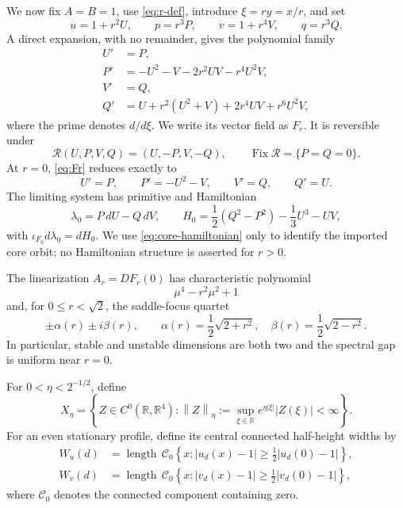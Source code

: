 \documentclass[11pt,reqno]{amsart}
\numberwithin{equation}{section}
\theoremstyle{remark}
\newcommand{\R}{\mathbb R}
\newcommand{\Fix}{\operatorname{Fix}}
\newcommand{\cR}{\mathcal R}
\newcommand{\norm}[1]{\left\lVert #1\right\rVert}
\begin{document}
We now fix $A=B=1$, use \eqref{eq:r-def}, introduce
$\xi=ry=x/r$, and set
\begin{equation}\label{eq:central-scaling}
 u=1+r^2U,\qquad p=r^3P,\qquad
 v=1+r^4V,\qquad q=r^3Q.
\end{equation}
A direct expansion, with no remainder, gives the polynomial family
\begin{equation}\label{eq:Fr}
 \begin{aligned}
 U'&=P,\\
 P'&=-U^2-V-2r^2UV-r^4U^2V,\\
 V'&=Q,\\
 Q'&=U+r^2(U^2+V)+2r^4UV+r^6U^2V,
 \end{aligned}
\end{equation}
where the prime denotes $d/d\xi$.  We write its vector field as $F_r$.
It is reversible under
\begin{equation}\label{eq:central-reverser}
 \cR(U,P,V,Q)=(U,-P,V,-Q),
 \qquad \Fix\cR=\{P=Q=0\}.
\end{equation}
At $r=0$, \eqref{eq:Fr} reduces exactly to
\begin{equation}\label{eq:core-system}
 U'=P,\qquad P'=-U^2-V,\qquad V'=Q,\qquad Q'=U.
\end{equation}
The limiting system has primitive and Hamiltonian
\begin{equation}\label{eq:core-hamiltonian}
 \lambda_0=P\,dU-Q\,dV,
 \qquad
 H_0=\frac12(Q^2-P^2)-\frac13U^3-UV,
\end{equation}
with $\iota_{F_0}d\lambda_0=dH_0$.  We use
\eqref{eq:core-hamiltonian} only to identify the imported core orbit; no
Hamiltonian structure is asserted for $r>0$.

The linearization $A_r=DF_r(0)$ has characteristic polynomial
\begin{equation}\label{eq:charpoly}
 \mu^4-r^2\mu^2+1
\end{equation}
and, for $0\le r<\sqrt2$, the saddle-focus quartet
\begin{equation}\label{eq:eigenvalues}
 \pm\alpha(r)\pm i\beta(r),
 \qquad
 \alpha(r)=\frac12\sqrt{2+r^2},\quad
 \beta(r)=\frac12\sqrt{2-r^2}.
\end{equation}
In particular, stable and unstable dimensions are both two and the spectral
gap is uniform near $r=0$.

For $0<\eta<2^{-1/2}$, define
\begin{equation}\label{eq:Xeta}
 X_\eta=\left\{Z\in C^0(\R,\R^4):
 \norm{Z}_\eta:=\sup_{\xi\in\R}e^{\eta|\xi|}|Z(\xi)|<\infty\right\}.
\end{equation}
For an even stationary profile, define its central connected half-height
widths by
\begin{equation}\label{eq:width-def}
 \begin{aligned}
 W_u(d)&=\operatorname{length}\,\mathcal C_0
 \left\{x:|u_d(x)-1|\ge\frac12|u_d(0)-1|\right\},\\
 W_v(d)&=\operatorname{length}\,\mathcal C_0
 \left\{x:|v_d(x)-1|\ge\frac12|v_d(0)-1|\right\},
 \end{aligned}
\end{equation}
where $\mathcal C_0$ denotes the connected component containing zero.
\end{document}
